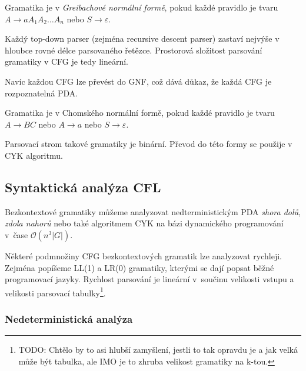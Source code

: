 
\bigskip

\begin{definition}
    Gramatika je v {\em Greibachové normální formě}, pokud
    každé pravidlo je tvaru
    $A \to a A_1 A_2 \ldots A_n$ nebo $S \to \varepsilon$.
\end{definition}

Každý top-down parser (zejména recursive descent parser)
zastaví nejvýše v hloubce rovné délce parsovaného řetězce. Prostorová
složitost parsování gramatiky v CFG je tedy lineární.

Navíc každou CFG lze převést do GNF, což dává důkaz, že každá CFG je
rozpoznatelná PDA.

\begin{definition}
    Gramatika je v Chomského normální formě, pokud každé pravidlo je
    tvaru $A \to BC$ nebo $A \to a$ nebo $S \to \varepsilon$.
\end{definition}

Parsovací strom takové gramatiky je binární. Převod do této formy se
použije v CYK algoritmu.


\subsection{Syntaktická analýza CFL}

Bezkontextové gramatiky můžeme analyzovat nedterministickým PDA
{\em shora dolů}, {\em zdola nahorů} nebo také algoritmem CYK na bázi
dynamického programování v~čase $\mathcal{O}(n^3 \lvert G \rvert)$.

Některé podmnožiny CFG bezkontextových gramatik lze analyzovat rychleji.
Zejména popíšeme LL(1) a LR(0) gramatiky, kterými se dají popsat běžné
programovací jazyky. Rychlost parsování je lineární v~součinu velikosti
vstupu a velikosti parsovací tabulky\footnote{TODO: Chtělo by to asi hlubší
zamyšlení, jestli to tak opravdu je a jak velká může být tabulka, ale
IMO je to zhruba velikost gramatiky na k-tou.}.

\subsubsection{Nedeterministická analýza}

